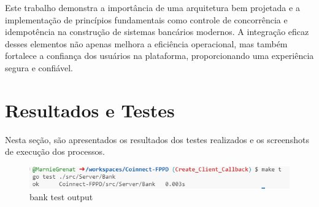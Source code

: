 \documentclass[a4paper,10pt]{article}
\begin{document}
\begin{multicols}{2}
Este trabalho demonstra a importância de uma arquitetura bem projetada e a implementação de princípios fundamentais como controle de concorrência e idempotência na construção de sistemas bancários modernos. A integração eficaz desses elementos não apenas melhora a eficiência operacional, mas também fortalece a confiança dos usuários na plataforma, proporcionando uma experiência segura e confiável.

\end{multicols}

\newpage

\section{Resultados e Testes}
Nesta seção, são apresentados os resultados dos testes realizados e os screenshots de execução dos processos.

\begin{figure}[h!]
    \centering
    \includegraphics[width=1\linewidth]{assets/image.png}
    \caption{bank test output}
    \label{fig:enter-label}
\end{figure}
\end{document}
